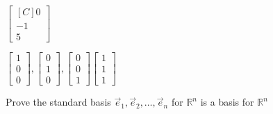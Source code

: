 \begin{exercise}
\begin{inparaenum}[a)]
\item $\begin{bmatrix*}[C]0\\-1 \\ 5\end{bmatrix*}$ \hfill 
\item $\begin{bmatrix}1 \\ 0 \\ 0\end{bmatrix}, \begin{bmatrix}0 \\ 1\\ 0\end{bmatrix}, \begin{bmatrix}0 \\ 0 \\ 1 \end{bmatrix} 
\begin{bmatrix}1 \\ 1 \\ 1 \end{bmatrix}$\hfill {} \\
\end{inparaenum}
\end{exercise}

\begin{exercise}
Prove the standard basis $\vec{e}_1, \vec{e}_2, \ldots, \vec{e}_n$ for $\mathbb{R}^n$ is a basis for $\mathbb{R}^n$
\end{exercise}
